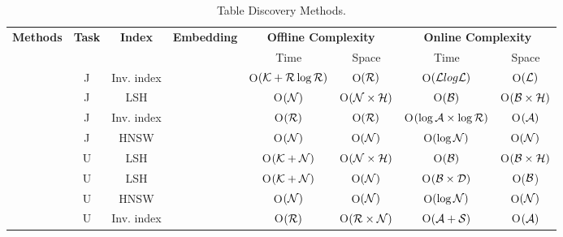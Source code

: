 
    \begin{table*}[t]
	\centering
	\caption{Table Discovery Methods.}
	\begin{tabular}{|c|c|c|c|cccc|}
		\hline
		\multirow{2}{1cm}{\textbf{Methods}} & \multirow{2}{0.6cm}{\textbf{Task}} & \multirow{2}{0.8cm}{\textbf{Index}} & \multirow{2}{1.6cm}{\textbf{Embedding}} & \multicolumn{2}{c}{\textbf{Offline Complexity}} & \multicolumn{2}{c|}{\textbf{Online Complexity}} \\
		&&&&Time    & Space  & Time & Space  \\ 
		\hline
		\josie~\cite{Josie} & J & Inv. index & \XSolidBrush  & O$(\mathcal{K} + \mathcal{R} \log \mathcal{R})$         & O$(\mathcal{R})$                   & O$(\mathcal{L} log \mathcal{L})$         & O$(\mathcal{L})$    \\
		\hline
		\lsh~\cite{LshEn} & J & LSH & \XSolidBrush& O$(\mathcal{N})$        & O$(\mathcal{N} \times \mathcal{H})$                   & O$(\mathcal{B})$                & O$(\mathcal{B} \times \mathcal{H})$  \\
		\hline
		\pex~\cite{Pexeso} & J &  Inv. index& \Checkmark  & O$(\mathcal{R})$        & O$(\mathcal{R})$                   & O$(\log \mathcal{A} \times \log \mathcal{R})$                & O$(\mathcal{A})$     \\
		\hline
		\deepjoin~\cite{DeepJoin} & J & HNSW & \Checkmark & O$(\mathcal{N})$         & O$(\mathcal{N})$                   & O$(\log \mathcal{N})$                & O$(\mathcal{N})$  \\
		\hline
		\tus~\cite{TUS} & U & LSH & \Checkmark  & O$(\mathcal{K} + \mathcal{N})$         & O$(\mathcal{N} \times \mathcal{H})$    & O$(\mathcal{B})$               &  O$(\mathcal{B} \times \mathcal{H})$     \\
		\hline
		\dlll~\cite{D3L} & U & LSH & \Checkmark& O$(\mathcal{K} + \mathcal{N})$          & O$(\mathcal{N})$                   & O$(\mathcal{B} \times \mathcal{D})$                & O($\mathcal{B}$)      \\
		\hline
		\starmie~\cite{Starmie} & U & HNSW & \Checkmark & O$(\mathcal{N})$         & O$(\mathcal{N})$                   & O$(\log \mathcal{N})$                & O$(\mathcal{N})$   \\
		\hline
		\santos~\cite{Santos} & U & Inv. index & \XSolidBrush & O$(\mathcal{R})$         & O$(\mathcal{R} \times \mathcal{N} )$    & O$(\mathcal{A} + \mathcal{S})$               & O$(\mathcal{A})$  \\

\end{tabular}
\end{table*}

